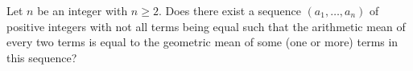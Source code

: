 Let $n$ be an integer with $n \geq 2$. Does there exist a sequence $(a_1, \ldots, a_n)$ of positive integers with not all terms being equal such that the arithmetic mean of every two terms is equal to the geometric mean of some (one or more) terms in this sequence?
